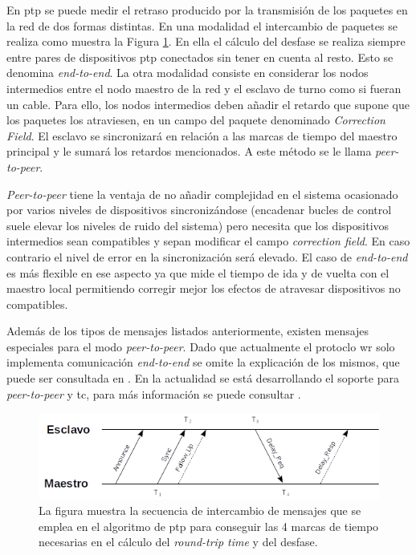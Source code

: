 En \gls{ptp} se puede medir el retraso producido por la transmisión de los 
paquetes en la red de dos formas distintas. En una modalidad el intercambio de 
paquetes se realiza como muestra la Figura \ref{fig:ptpts}. En ella el cálculo 
del desfase se realiza siempre entre pares de 
dispositivos \gls{ptp} conectados sin tener en cuenta al resto. Esto se 
denomina \textit{end-to-end}.
La otra modalidad consiste en considerar los nodos intermedios entre el nodo 
maestro de la red y el esclavo de turno como si fueran un cable. Para ello, 
los nodos intermedios deben añadir el retardo que supone que los paquetes 
los atraviesen, en un campo del paquete denominado \textit{Correction 
Field}. El esclavo se sincronizará en relación a las marcas de tiempo del 
maestro principal y le sumará los retardos mencionados. A este método se le 
llama \textit{peer-to-peer}.

\textit{Peer-to-peer} tiene la ventaja de no añadir complejidad en el sistema 
ocasionado por varios niveles de dispositivos sincronizándose (encadenar bucles 
de control suele elevar los niveles de ruido del sistema) pero necesita que los 
dispositivos intermedios sean compatibles y sepan modificar el campo 
\textit{correction field}. En caso contrario el nivel de error en la 
sincronización será elevado. El caso de \textit{end-to-end} es más flexible en 
ese aspecto ya que mide el tiempo de ida y de vuelta con el maestro local 
permitiendo corregir mejor los efectos de atravesar dispositivos no compatibles.

Además de los tipos de mensajes listados anteriormente, existen mensajes 
especiales para el modo \textit{peer-to-peer}. Dado que actualmente el protoclo 
\gls{wr} solo implementa comunicación \textit{end-to-end} se omite la 
explicación de los mismos, que puede ser consultada en \cite{IEEE1588_2008}.
En la actualidad se está desarrollando el soporte para \textit{peer-to-peer} y 
\gls{tc}, para más información se puede consultar .

\begin{figure}
	\centering
	\includegraphics[width=0.7\linewidth]{imagenes/ptp_ts}
	\caption[Intercambio de mensajes para el algoritmo de \acrshort{ptp}]{La 
	figura muestra la secuencia de intercambio de mensajes 
	que se emplea en el algoritmo de \gls{ptp} para conseguir las 4 marcas de 
	tiempo necesarias en el cálculo del \textit{round-trip time} y del desfase.}
	\label{fig:ptpts}
\end{figure}

